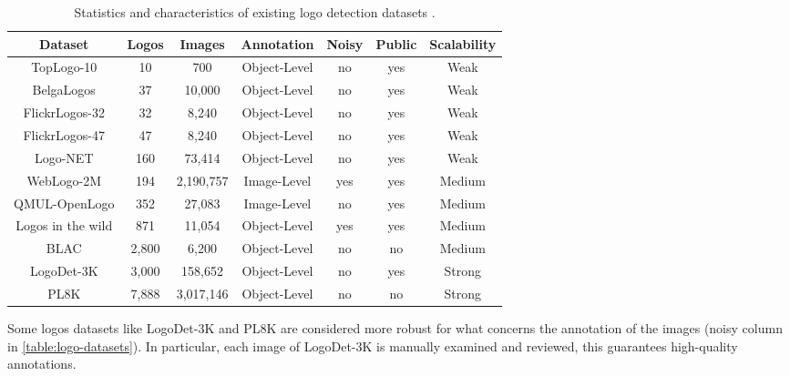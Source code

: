 \begin{table}
    \begin{center}
        \begin{tabular}{c || c | c | c | c | c |c} 
            \hline
            \textbf{Dataset} & \textbf{Logos} & \textbf{Images} & \textbf{Annotation} & \textbf{Noisy} & \textbf{Public} & \textbf{Scalability} \\
            \hline
            \hline
            TopLogo-10 \cite{su2017deep} & 10 & 700 & Object-Level & no & yes & Weak \\ 
       \hline
           BelgaLogos \cite{joly2009logo} & 37 & 10,000 & Object-Level & no & yes & Weak \\ 
       \hline
           FlickrLogos-32 \cite{romberg2011scalable} & 32 & 8,240 & Object-Level & no & yes & Weak \\ 
       \hline
           FlickrLogos-47 \cite{romberg2011scalable} & 47 & 8,240 & Object-Level & no & yes & Weak \\ 
       \hline
           Logo-NET \cite{hoi2015logo} & 160 & 73,414 & Object-Level & no & yes & Weak \\ 
       \hline
           WebLogo-2M \cite{su2017weblogo} & 194 & 2,190,757 & Image-Level & yes & yes & Medium \\ 
       \hline
           QMUL-OpenLogo \cite{su2018open} & 352 & 27,083 & Image-Level & no & yes & Medium \\ 
       \hline
           Logos in the wild \cite{tuzko2017open} & 871 & 11,054 & Object-Level & yes & yes & Medium \\ 
       \hline
           BLAC \cite{bastan2019large} & 2,800 & 6,200 & Object-Level & no & no & Medium \\ 
       \hline
           LogoDet-3K \cite{wang2022logodet} & 3,000 & 158,652 & Object-Level & no & yes & Strong \\ 
       \hline
           PL8K \cite{li2022seetek} & 7,888 & 3,017,146 & Object-Level & no & no & Strong \\ 
           \hline
       
           \end{tabular}
    \end{center}
    
    \caption{Statistics and characteristics of existing logo detection datasets \cite{li2022seetek}.}
    \label{table:logo-datasets}
\end{table}

Some logos datasets like LogoDet-3K and PL8K are considered more robust for what concerns the annotation of the images (noisy column in \autoref{table:logo-datasets}). In particular, each image of LogoDet-3K is manually examined and
reviewed, this guarantees high-quality annotations.

